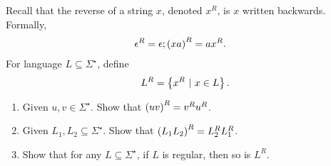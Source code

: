 \documentclass{article}
\begin{document}
\begin{question}
Recall that the reverse of a string $x$, denoted $x^R$, is $x$ written backwards. Formally,
\begin{eqnarray}
\epsilon^R=\epsilon;&\left( xa \right)^R=ax^R.
\end{eqnarray}
For language $L\subseteq\Sigma^{\star}$, define
\begin{equation}
L^R=\left\{ x^R\ |\ x\in L \right\}.
\end{equation}
\begin{enumerate}
 \item Given $u,v\in\Sigma^{\star}$. Show that $\left( uv \right)^R=v^Ru^R$.
 \item Given $L_1,L_2\subseteq\Sigma^{\star}$. Show that $\left( L_1 L_2 \right)^R=L_2^RL_1^R$.
 \item Show that for any $L\subseteq\Sigma^{\star}$, if $L$ is regular, then so is $L^R$.
\end{enumerate}
\begin{answer}
\end{answer}
\end{question}
\end{document}
